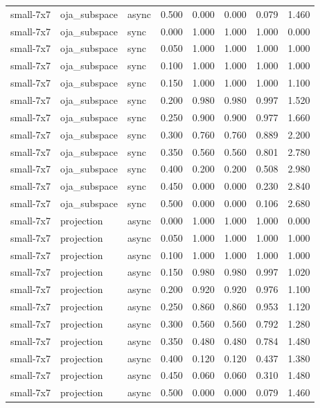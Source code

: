 \begin{tabular}{lllrrrrr}
small-7x7 & oja\_subspace & async & 0.500 & 0.000 & 0.000 & 0.079 & 1.460 \\
small-7x7 & oja\_subspace & sync & 0.000 & 1.000 & 1.000 & 1.000 & 0.000 \\
small-7x7 & oja\_subspace & sync & 0.050 & 1.000 & 1.000 & 1.000 & 1.000 \\
small-7x7 & oja\_subspace & sync & 0.100 & 1.000 & 1.000 & 1.000 & 1.000 \\
small-7x7 & oja\_subspace & sync & 0.150 & 1.000 & 1.000 & 1.000 & 1.100 \\
small-7x7 & oja\_subspace & sync & 0.200 & 0.980 & 0.980 & 0.997 & 1.520 \\
small-7x7 & oja\_subspace & sync & 0.250 & 0.900 & 0.900 & 0.977 & 1.660 \\
small-7x7 & oja\_subspace & sync & 0.300 & 0.760 & 0.760 & 0.889 & 2.200 \\
small-7x7 & oja\_subspace & sync & 0.350 & 0.560 & 0.560 & 0.801 & 2.780 \\
small-7x7 & oja\_subspace & sync & 0.400 & 0.200 & 0.200 & 0.508 & 2.980 \\
small-7x7 & oja\_subspace & sync & 0.450 & 0.000 & 0.000 & 0.230 & 2.840 \\
small-7x7 & oja\_subspace & sync & 0.500 & 0.000 & 0.000 & 0.106 & 2.680 \\
small-7x7 & projection & async & 0.000 & 1.000 & 1.000 & 1.000 & 0.000 \\
small-7x7 & projection & async & 0.050 & 1.000 & 1.000 & 1.000 & 1.000 \\
small-7x7 & projection & async & 0.100 & 1.000 & 1.000 & 1.000 & 1.000 \\
small-7x7 & projection & async & 0.150 & 0.980 & 0.980 & 0.997 & 1.020 \\
small-7x7 & projection & async & 0.200 & 0.920 & 0.920 & 0.976 & 1.100 \\
small-7x7 & projection & async & 0.250 & 0.860 & 0.860 & 0.953 & 1.120 \\
small-7x7 & projection & async & 0.300 & 0.560 & 0.560 & 0.792 & 1.280 \\
small-7x7 & projection & async & 0.350 & 0.480 & 0.480 & 0.784 & 1.480 \\
small-7x7 & projection & async & 0.400 & 0.120 & 0.120 & 0.437 & 1.380 \\
small-7x7 & projection & async & 0.450 & 0.060 & 0.060 & 0.310 & 1.480 \\
small-7x7 & projection & async & 0.500 & 0.000 & 0.000 & 0.079 & 1.460 \\

\end{tabular}
